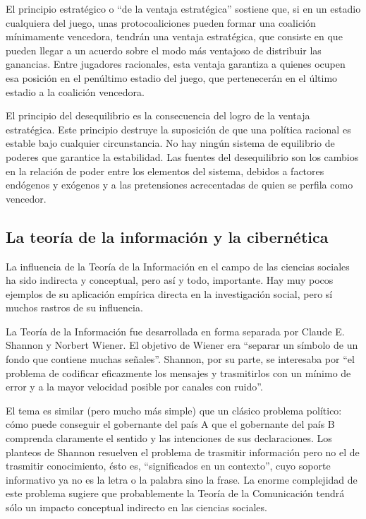 \documentclass[
]{book}
\begin{document}
El principio estratégico o ``de la ventaja estratégica'' sostiene que, si en un estadio cualquiera del juego, unas protocoaliciones pueden formar una coalición mínimamente vencedora, tendrán una ventaja estratégica, que consiste en que pueden llegar a un acuerdo sobre el modo más ventajoso de distribuir las ganancias. Entre jugadores racionales, esta ventaja garantiza a quienes ocupen esa posición en el penúltimo estadio del juego, que pertenecerán en el último estadio a la coalición vencedora.

El principio del desequilibrio es la consecuencia del logro de la ventaja estratégica. Este principio destruye la suposición de que una política racional es estable bajo cualquier circunstancia. No hay ningún sistema de equilibrio de poderes que garantice la estabilidad. Las fuentes del desequilibrio son los cambios en la relación de poder entre los elementos del sistema, debidos a factores endógenos y exógenos y a las pretensiones acrecentadas de quien se perfila como vencedor.

\hypertarget{la-teoruxeda-de-la-informaciuxf3n-y-la-cibernuxe9tica}{%
\subsection*{La teoría de la información y la cibernética}\label{la-teoruxeda-de-la-informaciuxf3n-y-la-cibernuxe9tica}}

La influencia de la Teoría de la Información en el campo de las ciencias sociales ha sido indirecta y conceptual, pero así y todo, importante. Hay muy pocos ejemplos de su aplicación empírica directa en la investigación social, pero sí muchos rastros de su influencia.

La Teoría de la Información fue desarrollada en forma separada por Claude E. Shannon y Norbert Wiener. El objetivo de Wiener era ``separar un símbolo de un fondo que contiene muchas señales''. Shannon, por su parte, se interesaba por ``el problema de codificar eficazmente los mensajes y trasmitirlos con un mínimo de error y a la mayor velocidad posible por canales con ruido''.

El tema es similar (pero mucho más simple) que un clásico problema político: cómo puede conseguir el gobernante del país A que el gobernante del país B comprenda claramente el sentido y las intenciones de sus declaraciones. Los planteos de Shannon resuelven el problema de trasmitir información pero no el de trasmitir conocimiento, ésto es, ``significados en un contexto'', cuyo soporte informativo ya no es la letra o la palabra sino la frase. La enorme complejidad de este problema sugiere que probablemente la Teoría de la Comunicación tendrá sólo un impacto conceptual indirecto en las ciencias sociales.
\end{document}
